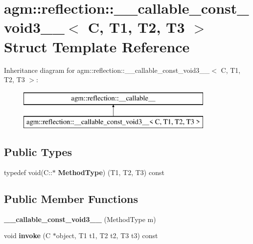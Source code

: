 \hypertarget{structagm_1_1reflection_1_1____callable__const__void3____}{}\section{agm\+:\+:reflection\+:\+:\+\_\+\+\_\+callable\+\_\+const\+\_\+void3\+\_\+\+\_\+$<$ C, T1, T2, T3 $>$ Struct Template Reference}
\label{structagm_1_1reflection_1_1____callable__const__void3____}
Inheritance diagram for agm\+:\+:reflection\+:\+:\+\_\+\+\_\+callable\+\_\+const\+\_\+void3\+\_\+\+\_\+$<$ C, T1, T2, T3 $>$\+:\begin{figure}[H]
\begin{center}
\leavevmode
\includegraphics[height=2.000000cm]{structagm_1_1reflection_1_1____callable__const__void3____}
\end{center}
\end{figure}
\subsection*{Public Types}
\begin{DoxyCompactItemize}
\item 
typedef void(C\+::$\ast$ {\bfseries Method\+Type}) (T1, T2, T3) const \hypertarget{structagm_1_1reflection_1_1____callable__const__void3_____a7815e3dfed325ef3477f86d1d71ae49c}{}\label{structagm_1_1reflection_1_1____callable__const__void3_____a7815e3dfed325ef3477f86d1d71ae49c}

\end{DoxyCompactItemize}
\subsection*{Public Member Functions}
\begin{DoxyCompactItemize}
\item 
{\bfseries \+\_\+\+\_\+callable\+\_\+const\+\_\+void3\+\_\+\+\_\+} (Method\+Type m)\hypertarget{structagm_1_1reflection_1_1____callable__const__void3_____a8a050c836151d148df8803d034234384}{}\label{structagm_1_1reflection_1_1____callable__const__void3_____a8a050c836151d148df8803d034234384}

\item 
void {\bfseries invoke} (C $\ast$object, T1 t1, T2 t2, T3 t3) const \hypertarget{structagm_1_1reflection_1_1____callable__const__void3_____a8dd114ab1ce3b6be99234d804d344a6f}{}\label{structagm_1_1reflection_1_1____callable__const__void3_____a8dd114ab1ce3b6be99234d804d344a6f}

\end{DoxyCompactItemize}
